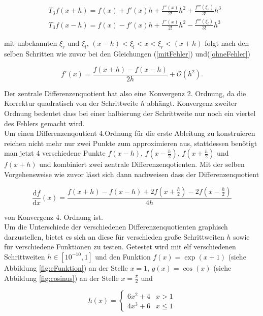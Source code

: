 \begin{align}
	&T_3f(x+h)= f(x) + f'(x)h +\frac{f''(x)}{2!}h^2 + \frac{f'''(\xi_r)}{3!}h^3
	\label{(x+h)}\\
	&T_3f(x-h)= f(x) - f'(x)h +\frac{f''(x)}{2!}h^2 - \frac{f'''(\xi_l)}{3!}h^3
	\label{(x-h)}
\end{align}

mit unbekannten $\xi_r$ und $\xi_l$, $(x-h) < \xi_l < x < \xi_r < (x+h)$ folgt nach den selben Schritten wie zuvor bei den Gleichungen (\ref{mitFehler}) und(\ref{ohneFehler}) 

\begin{equation*}
	f'(x) = \frac{f(x+h)-f(x-h)}{2h} + \mathcal{O}(h^2).
\end{equation*}

Der zentrale Differenzenquotient hat also eine Konvergenz 2. Ordnung, da die Korrektur quadratisch von der Schrittweite $h$ abhängt. Konvergenz zweiter Ordnung bedeutet dass bei einer halbierung der Schrittweite nur noch ein viertel des Fehlers gemacht wird.\\
Um einen Differenzenqoutient 4.Ordnung für die erste Ableitung zu konstruieren reichen nicht mehr nur zwei Punkte zum approximieren aus, stattdessen benötigt man jetzt 4 verschiedene Punkte $f(x-h)$, $f(x-\frac{h}{2})$, $f(x+\frac{h}{2})$ und $f(x+h)$ und kombiniert zwei zentrale Differenzenqotienten. Mit der selben Vorgehensweise wie zuvor lässt sich dann nachweisen dass der Differenzenquotient

\begin{equation*}
	\frac{\mathrm{d}f}{\mathrm{d}x}(x) = \frac{f(x+h)-f(x-h)+2f(x+\frac{h}{2})-2f(x-\frac{h}{2})}{4h}
\end{equation*}

von Konvergenz 4. Ordnung ist.\\

Um die Unterschiede der verschiedenen Differenzenquotienten graphisch darzustellen, bietet es sich an diese für verschieden große Schrittweiten $h$ sowie für verschiedene Funktionen zu testen. Getestet wird mit elf verschiedenen Schrittweiten $h \in [10^{-10},1]$ und den Funktion $f(x) = \exp(x+1)$ (siehe Abbildung \ref{fig:eFunktion}) an der Stelle $x=1$, $g(x) = \cos(x)$ (siehe Abbildung \ref{fig:cosinus}) an der Stelle $ x = \frac{\pi}{2}$ und 

\begin{equation}
	h(x)=
		 \begin{cases}
			6x^2+ 4 & x>1\\
			4x^3+6 & x\leq 1
		\end{cases}
	\label{polynom}
\end{equation}

